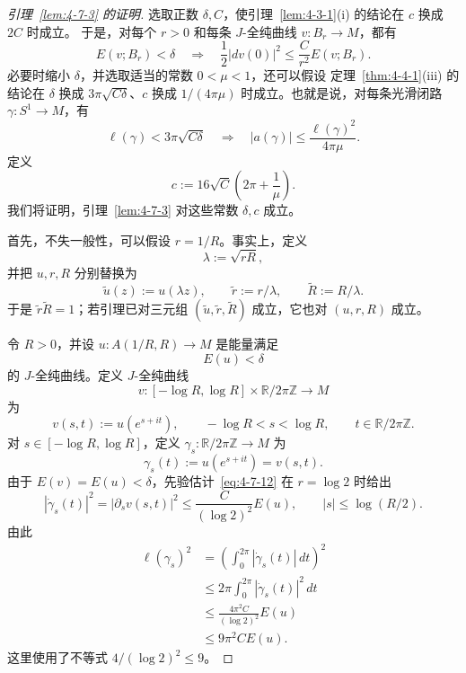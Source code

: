 \begin{proof}[引理~\ref{lem:4-7-3} 的证明]
选取正数 $\delta,C$，使引理~\ref{lem:4-3-1}(i) 的结论在 $c$ 换成 $2C$ 时成立。
于是，对每个 $r>0$ 和每条 $J$-全纯曲线 $v:B_r\to M$，都有
\begin{equation}\label{eq:4-7-12}
  E(v;B_r)<\delta
  \quad\Longrightarrow\quad
  \frac12|dv(0)|^2\le\frac C{r^2}E(v;B_r).
\end{equation}
必要时缩小 $\delta$，并选取适当的常数 $0<\mu<1$，还可以假设
定理~\ref{thm:4-4-1}(iii) 的结论在 $\delta$ 换成
$3\pi\sqrt{C\delta}$、$c$ 换成 $1/(4\pi\mu)$ 时成立。也就是说，对每条光滑闭路
$\gamma:S^1\to M$，有
\begin{equation}\label{eq:4-7-13}
  \ell(\gamma)<3\pi\sqrt{C\delta}
  \quad\Longrightarrow\quad
  |a(\gamma)|\le\frac{\ell(\gamma)^2}{4\pi\mu}.
\end{equation}
定义
\begin{equation}\label{eq:4-7-14}
  c:=16\sqrt C\left(2\pi+\frac1\mu\right).
\end{equation}
我们将证明，引理~\ref{lem:4-7-3} 对这些常数 $\delta,c$ 成立。

首先，不失一般性，可以假设 $r=1/R$。事实上，定义
\[
  \lambda:=\sqrt{rR},
\]
并把 $u,r,R$ 分别替换为
\[
  \widetilde u(z):=u(\lambda z),
  \qquad
  \widetilde r:=r/\lambda,
  \qquad
  \widetilde R:=R/\lambda.
\]
于是 $\widetilde r\widetilde R=1$；若引理已对三元组
$(\widetilde u,\widetilde r,\widetilde R)$ 成立，它也对 $(u,r,R)$ 成立。

令 $R>0$，并设 $u:A(1/R,R)\to M$ 是能量满足
\[
  E(u)<\delta
\]
的 $J$-全纯曲线。定义 $J$-全纯曲线
\[
  v:[-\log R,\log R]\times\mathbb R/2\pi\mathbb Z\to M
\]
为
\[
  v(s,t):=u(e^{s+it}),
  \qquad
  -\log R<s<\log R,
  \qquad
  t\in\mathbb R/2\pi\mathbb Z.
\]
对 $s\in[-\log R,\log R]$，定义
$\gamma_s:\mathbb R/2\pi\mathbb Z\to M$ 为
\[
  \gamma_s(t):=u(e^{s+it})=v(s,t).
\]
由于 $E(v)=E(u)<\delta$，先验估计~\eqref{eq:4-7-12} 在 $r=\log2$ 时给出
\begin{equation}\label{eq:4-7-15}
  |\dot\gamma_s(t)|^2=|\partial_sv(s,t)|^2
  \le\frac C{(\log2)^2}E(u),
  \qquad |s|\le\log(R/2).
\end{equation}
由此
\[
  \begin{aligned}
  \ell(\gamma_s)^2
  &=\left(\int_0^{2\pi}|\dot\gamma_s(t)|\,dt\right)^2\\
  &\le2\pi\int_0^{2\pi}|\dot\gamma_s(t)|^2\,dt\\
  &\le\frac{4\pi^2C}{(\log2)^2}E(u)\\
  &\le9\pi^2CE(u).
  \end{aligned}
\]
这里使用了不等式 $4/(\log2)^2\le9$。


\end{proof}
